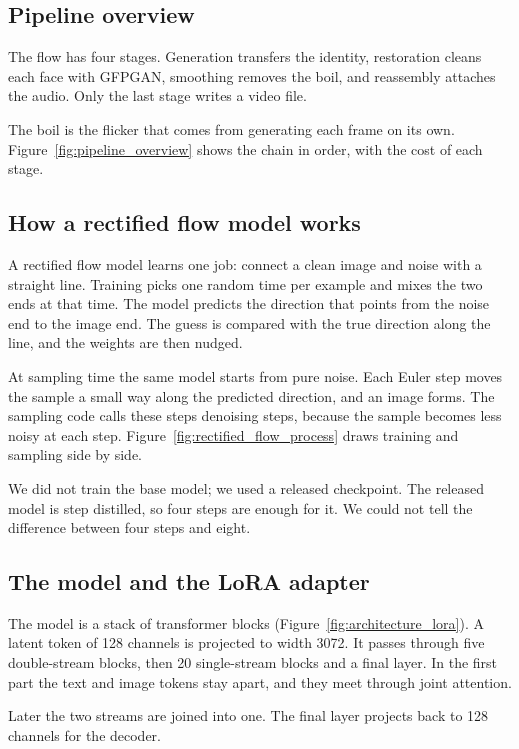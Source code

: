 \subsection{Pipeline overview}
The flow has four stages. Generation transfers the identity, restoration cleans each face with GFPGAN, smoothing removes the boil, and reassembly attaches the audio. Only the last stage writes a video file.

The boil is the flicker that comes from generating each frame on its own. Figure~\ref{fig:pipeline_overview} shows the chain in order, with the cost of each stage.


\subsection{How a rectified flow model works}
A rectified flow model learns one job: connect a clean image and noise with a straight line. Training picks one random time per example and mixes the two ends at that time. The model predicts the direction that points from the noise end to the image end. The guess is compared with the true direction along the line, and the weights are then nudged.

At sampling time the same model starts from pure noise. Each Euler step moves the sample a small way along the predicted direction, and an image forms. The sampling code calls these steps denoising steps, because the sample becomes less noisy at each step. Figure~\ref{fig:rectified_flow_process} draws training and sampling side by side.

We did not train the base model; we used a released checkpoint. The released model is step distilled, so four steps are enough for it. We could not tell the difference between four steps and eight.


\subsection{The model and the LoRA adapter}
The model is a stack of transformer blocks (Figure~\ref{fig:architecture_lora}). A latent token of 128 channels is projected to width 3072. It passes through five double-stream blocks, then 20 single-stream blocks and a final layer. In the first part the text and image tokens stay apart, and they meet through joint attention.

Later the two streams are joined into one. The final layer projects back to 128 channels for the decoder.

